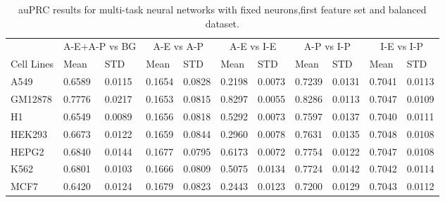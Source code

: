 \begin{table}[!htbp]
\centering
\caption{auPRC results for multi-task neural networks with fixed neurons,first feature set and balanced dataset.}
\label{tab:balanced_auprc}
\hspace*{-2.2cm}
\begin{tabular}[t]{*{11}{l}}
\toprule
 & \multicolumn{2}{c}{A-E+A-P vs BG} & \multicolumn{2}{c}{A-E vs A-P} & \multicolumn{2}{c}{A-E vs I-E} & \multicolumn{2}{c}{A-P vs I-P} & \multicolumn{2}{c}{I-E vs I-P} \\
\cmidrule(lr){2-3}
\cmidrule(lr){4-5}
\cmidrule(lr){6-7}
\cmidrule(lr){8-9}
\cmidrule(lr){10-11}
Cell Lines & Mean & STD & Mean & STD & Mean & STD & Mean & STD & Mean & STD \\
\midrule
A549  & 0.6589 & 0.0115 & 0.1654 & 0.0828 & 0.2198 & 0.0073 & 0.7239 & 0.0131 & 0.7041 & 0.0113\\
GM12878  & 0.7776 & 0.0217 & 0.1653 & 0.0815 & 0.8297 & 0.0055 & 0.8286 & 0.0113 & 0.7047 & 0.0109\\
H1  & 0.6549 & 0.0089 & 0.1656 & 0.0818 & 0.5292 & 0.0073 & 0.7597 & 0.0137 & 0.7040 & 0.0111\\
HEK293  & 0.6673 & 0.0122 & 0.1659 & 0.0844 & 0.2960 & 0.0078 & 0.7631 & 0.0135 & 0.7048 & 0.0108\\
HEPG2  & 0.6840 & 0.0144 & 0.1677 & 0.0795 & 0.6173 & 0.0072 & 0.7754 & 0.0122 & 0.7047 & 0.0108\\
K562  & 0.6801 & 0.0103 & 0.1666 & 0.0809 & 0.5075 & 0.0134 & 0.7724 & 0.0142 & 0.7042 & 0.0114\\
MCF7  & 0.6420 & 0.0124 & 0.1679 & 0.0823 & 0.2443 & 0.0123 & 0.7200 & 0.0129 & 0.7043 & 0.0112\\
\bottomrule
\end{tabular}
\hspace*{-2.2cm}
\end{table}
%
%
